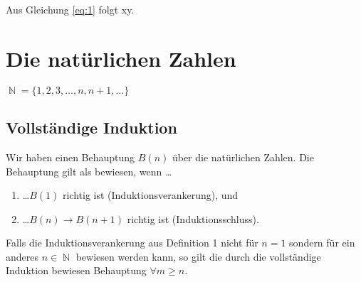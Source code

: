\documentclass[11pt, paper=a4]{scrartcl}
\begin{document}
Aus Gleichung \ref{eq:1} folgt xy.


\section{Die natürlichen Zahlen}

$\BbbN = \lbrace 1, 2, 3, \ldots , n, n+1, \ldots \rbrace$


\subsection{Vollständige Induktion}

Wir haben einen Behauptung $B(n)$ über die natürlichen Zahlen. Die
Behauptung gilt als bewiesen, wenn \ldots

\begin{enumerate}
\item \ldots $B(1)$ richtig ist (Induktionsverankerung), und
\item \ldots $B(n) \rightarrow B(n+1)$ richtig ist (Induktionsschluss).
\end{enumerate}

\begin{Bem}
Falls die Induktionsverankerung aus Definition 1 nicht für $n = 1$
sondern für ein anderes $n \in \BbbN$ bewiesen werden kann, so gilt
die durch die vollständige Induktion bewiesen Behauptung $\forall
m \geq n$.
\end{Bem}


\newpage

\end{document}
